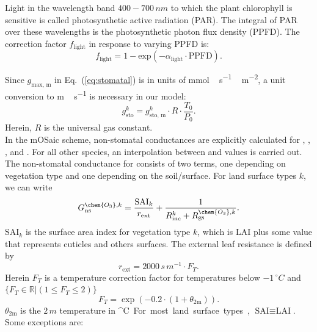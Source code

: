 \documentclass[gmd, manuscript]{copernicus}
\begin{document}
Light in the wavelength band $400-700\,\unit{nm}$ to which the plant chlorophyll is sensitive is called photosynthetic active radiation (PAR). The integral of PAR over these wavelengths is the photosynthetic photon flux density (PPFD). The correction factor $f_\mathrm{light}$ in response to varying PPFD is:
\begin{equation}
  f_\text{light} = 1-\text{exp}(-\alpha_\text{light}\cdot \text{PPFD}).
  \label{eq:flight}
\end{equation}

Since $g_\text{max, m}$ in Eq.~(\ref{eq:stomatal}) is in units of \unit{mmol\,s^{-1}\,m^{-2}}, a unit conversion to \unit{m\,s^{-1}} is necessary in our model:
\begin{equation}
  g^k_{\text{sto}} = g_{\text{sto, m}}^k \cdot R \cdot \frac{T_0}{P_0}.
\end{equation}
Herein, $R$ is the universal gas constant.\\
In the mOSaic scheme, non-stomatal conductances are explicitly calculated for , , , and . For all other species, an interpolation between  and  values is carried out.
The non-stomatal conductance for  consists of two terms, one depending on vegetation type and one depending on the soil/surface. For land surface types $k$, we can write
\begin{equation}
  G_\text{ns}^{\chem{O_3}, k} = \frac{\text{SAI}_k}{r_\text{ext}} + \frac{1}{R_\text{inc}^k + R_\text{gs}^{\chem{O_3},k}}.
  \label{eq:non-stomata-cond}
\end{equation}
$\text{SAI}_k$ is the surface area index for vegetation type $k$, which is $\text{LAI}$ plus some value that represents cuticles and others surfaces. The external leaf resistance is defined by
\begin{equation}
  r_\text{ext} = 2000\,\unit{s\,m^{-1}}\cdot F_T.
\end{equation}
Herein $F_T$ is a temperature correction factor for temperatures below $-1\,\unit{^\circ C}$ and $\{F_T \in \mathbb{R} | (1 \leq F_T \leq 2)\}$
\begin{equation}
  F_T = \exp{(-0.2\cdot(1+\theta_\text{2m}))}.
\end{equation}
$\theta_\text{2m}$ is the $2\,\unit{m}$ temperature in \unit{^\circ C}. For most land surface types, $\text{SAI} \equiv \text{LAI}$. Some exceptions are: 
\end{document}
